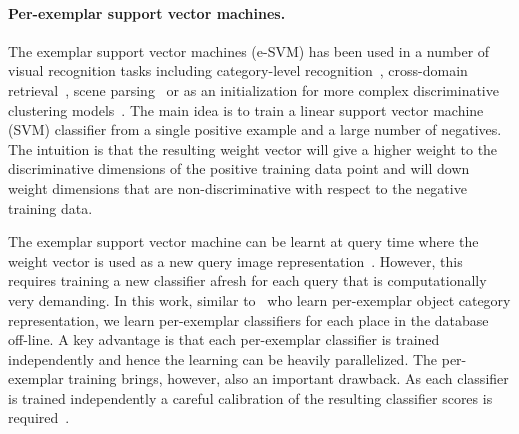   \paragraph{Per-exemplar support vector machines.} 
    The exemplar support vector machines (e-SVM) has been used in a number of visual recognition tasks including category-level recognition~\cite{Malisiewicz11}, cross-domain retrieval~\cite{Shrivastava11}, scene parsing~\cite{Tighe13} or as an initialization  for more complex discriminative clustering models~\cite{Doersch12,Singh12}. The main idea is to train a linear support vector machine (SVM) classifier from a single positive example and a large number of negatives. The intuition is that the resulting weight vector will give a higher weight to the discriminative dimensions of the positive training data point and will down weight dimensions that are non-discriminative with respect to the negative training data. 
    
    {
      The exemplar support vector machine can be learnt at query time where the weight vector is used as a new query image representation~\cite{Shrivastava11}. However, this requires training a new classifier afresh for each query that is computationally very demanding. In this work, similar to~\cite{Malisiewicz11} who learn per-exemplar object category representation, we learn per-exemplar classifiers for each place in the database off-line.  A key advantage is that each per-exemplar classifier is trained independently and hence the learning can be heavily parallelized. The per-exemplar training brings, however, also an important drawback. As each classifier is trained independently a careful calibration of the resulting classifier scores is required~\cite{Malisiewicz11}.
    }
      
